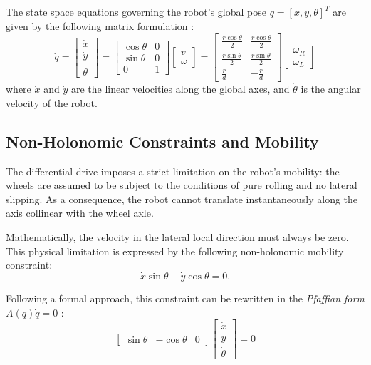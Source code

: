 The state space equations governing the robot's global pose $q = [x, y, \theta]^T$ are given by the following matrix formulation \cite{palli_amr_slides}:
\begin{equation}
    \dot{q} = \begin{bmatrix} \dot{x} \\ \dot{y} \\ \dot{\theta} \end{bmatrix} =
    \begin{bmatrix} \cos\theta & 0 \\ \sin \theta & 0 \\ 0 & 1 \end{bmatrix}
    \begin{bmatrix} v \\ \omega \end{bmatrix} =     
    \begin{bmatrix} 
    \frac{r\cos \theta}{2} & \frac{r\cos \theta}{2} \\ 
    \frac{r\sin \theta}{2} & \frac{r\sin \theta}{2} \\ 
    \frac{r}{d} & -\frac{r}{d} 
    \end{bmatrix}
    \begin{bmatrix} \omega_R \\ \omega_L \end{bmatrix}
\end{equation}
where $\dot{x}$ and $\dot{y}$ are the linear velocities along the global axes, and $\dot{\theta}$ is the angular velocity of the robot.

\subsection{Non-Holonomic Constraints and Mobility}
\label{subsec:non holonomic constr}

The differential drive imposes a strict limitation on the robot's mobility: the wheels are assumed to be subject to the conditions of pure rolling and no lateral slipping. As a consequence, the robot cannot translate instantaneously along the axis collinear with the wheel axle.

Mathematically, the velocity in the lateral local direction must always be zero. This physical limitation is expressed by the following non-holonomic mobility constraint:
\begin{equation}
    \dot{x} \sin\theta - \dot{y} \cos\theta = 0.
\end{equation}

Following a formal approach, this constraint can be rewritten in the \emph{Pfaffian form} \\ $A(q)\dot{q} = 0$ \cite{palli_amr_slides}:
\begin{equation}
    \begin{bmatrix} \sin \theta & -\cos \theta & 0 \end{bmatrix}
    \begin{bmatrix} \dot{x} \\ \dot{y} \\ \dot{\theta} \end{bmatrix} = 0
\end{equation}

